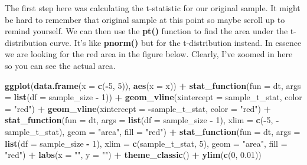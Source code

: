 \documentclass[
]{article}
\newenvironment{Shaded}{\begin{snugshade}}{\end{snugshade}}
\newcommand{\DataTypeTok}[1]{\textcolor[rgb]{0.13,0.29,0.53}{#1}}
\newcommand{\DecValTok}[1]{\textcolor[rgb]{0.00,0.00,0.81}{#1}}
\newcommand{\FloatTok}[1]{\textcolor[rgb]{0.00,0.00,0.81}{#1}}
\newcommand{\KeywordTok}[1]{\textcolor[rgb]{0.13,0.29,0.53}{\textbf{#1}}}
\newcommand{\NormalTok}[1]{#1}
\newcommand{\OperatorTok}[1]{\textcolor[rgb]{0.81,0.36,0.00}{\textbf{#1}}}
\newcommand{\StringTok}[1]{\textcolor[rgb]{0.31,0.60,0.02}{#1}}
\begin{document}
The first step here was calculating the t-statistic for our original
sample. It might be hard to remember that original sample at this point
so maybe scroll up to remind yourself. We can then use the \textbf{pt()}
function to find the area under the t-distribution curve. It's like
\textbf{pnorm()} but for the t-distribution instead. In essence we are
looking for the red area in the figure below. Clearly, I've zoomed in
here so you can see the actual area.

\begin{Shaded}
\begin{Highlighting}[]
\KeywordTok{ggplot}\NormalTok{(}\KeywordTok{data.frame}\NormalTok{(}\DataTypeTok{x =} \KeywordTok{c}\NormalTok{(}\OperatorTok{-}\DecValTok{5}\NormalTok{, }\DecValTok{5}\NormalTok{)), }\KeywordTok{aes}\NormalTok{(}\DataTypeTok{x =}\NormalTok{ x)) }\OperatorTok{+}
\StringTok{    }\KeywordTok{stat_function}\NormalTok{(}\DataTypeTok{fun =}\NormalTok{ dt, }
                \DataTypeTok{args =} \KeywordTok{list}\NormalTok{(}\DataTypeTok{df =}\NormalTok{ sample_size }\OperatorTok{-}\StringTok{ }\DecValTok{1}\NormalTok{)) }\OperatorTok{+}
\StringTok{  }\KeywordTok{geom_vline}\NormalTok{(}\DataTypeTok{xintercept =}\NormalTok{ sample_t_stat, }\DataTypeTok{color =} \StringTok{"red"}\NormalTok{) }\OperatorTok{+}
\StringTok{  }\KeywordTok{geom_vline}\NormalTok{(}\DataTypeTok{xintercept =} \OperatorTok{-}\NormalTok{sample_t_stat, }\DataTypeTok{color =} \StringTok{"red"}\NormalTok{) }\OperatorTok{+}
\StringTok{  }\KeywordTok{stat_function}\NormalTok{(}\DataTypeTok{fun =}\NormalTok{ dt, }
                \DataTypeTok{args =} \KeywordTok{list}\NormalTok{(}\DataTypeTok{df =}\NormalTok{ sample_size }\OperatorTok{-}\StringTok{ }\DecValTok{1}\NormalTok{),}
                \DataTypeTok{xlim =} \KeywordTok{c}\NormalTok{(}\OperatorTok{-}\DecValTok{5}\NormalTok{, }\OperatorTok{-}\NormalTok{sample_t_stat),}
                \DataTypeTok{geom =} \StringTok{"area"}\NormalTok{, }\DataTypeTok{fill =} \StringTok{"red"}\NormalTok{) }\OperatorTok{+}
\StringTok{    }\KeywordTok{stat_function}\NormalTok{(}\DataTypeTok{fun =}\NormalTok{ dt, }
                \DataTypeTok{args =} \KeywordTok{list}\NormalTok{(}\DataTypeTok{df =}\NormalTok{ sample_size }\OperatorTok{-}\StringTok{ }\DecValTok{1}\NormalTok{),}
                \DataTypeTok{xlim =} \KeywordTok{c}\NormalTok{(sample_t_stat, }\DecValTok{5}\NormalTok{),}
                \DataTypeTok{geom =} \StringTok{"area"}\NormalTok{, }\DataTypeTok{fill =} \StringTok{"red"}\NormalTok{) }\OperatorTok{+}
\StringTok{  }\KeywordTok{labs}\NormalTok{(}\DataTypeTok{x =} \StringTok{""}\NormalTok{, }\DataTypeTok{y =} \StringTok{""}\NormalTok{) }\OperatorTok{+}\StringTok{ }\KeywordTok{theme_classic}\NormalTok{() }\OperatorTok{+}\StringTok{ }\KeywordTok{ylim}\NormalTok{(}\KeywordTok{c}\NormalTok{(}\DecValTok{0}\NormalTok{, }\FloatTok{0.01}\NormalTok{))}
\end{Highlighting}
\end{Shaded}
\end{document}

